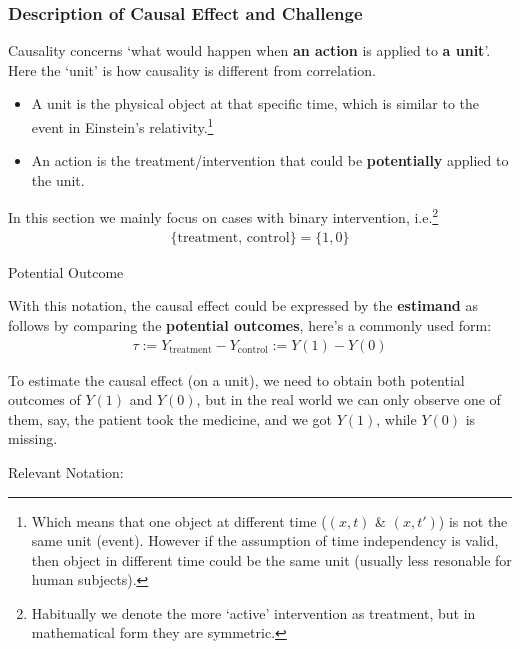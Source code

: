 \subsubsection{Description of Causal Effect and Challenge}
    Causality concerns `what would happen when \textbf{an action} is applied to \textbf{a unit}'. Here the `unit' is how causality is different from correlation.
\begin{itemize}[topsep=2pt,itemsep=0pt]
    \item A unit is the physical object at that specific time, which is similar to the event in Einstein's relativity.\footnote{Which means that one object at different time ($ (x,t) $ \& $ (x,t') $) is not the same unit (event). However if the assumption of time independency is valid, then object in different time could be the same unit (usually less resonable for human subjects).}
    \item An action is the treatment/intervention that could be \textbf{potentially} applied to the unit. 
\end{itemize}

    In this section we mainly focus on cases with binary intervention, i.e.\footnote{Habitually we denote the more `active' intervention as treatment, but in mathematical form they are symmetric.}
    \begin{align}
        \{\mathrm{treatment},\,\mathrm{control} \}=\{1,0\} 
    \end{align}

\begin{point}
    Potential Outcome
\end{point}

    With this notation, the causal effect could be expressed by the \textbf{estimand} as follows by  comparing the \textbf{potential outcomes}, here's a commonly used form:
    \begin{align}
        \tau:=Y_\mathrm{treatment} -Y_\mathrm{control} :=Y(1)-Y(0)
    \end{align}

    To estimate the causal effect (on a unit), we need to obtain both potential outcomes of $ Y(1) $ and $ Y(0) $, but in the real world we can only observe one of them, say, the patient took the medicine, and we got $ Y(1) $, while $ Y(0) $ is missing.

    Relevant Notation:


